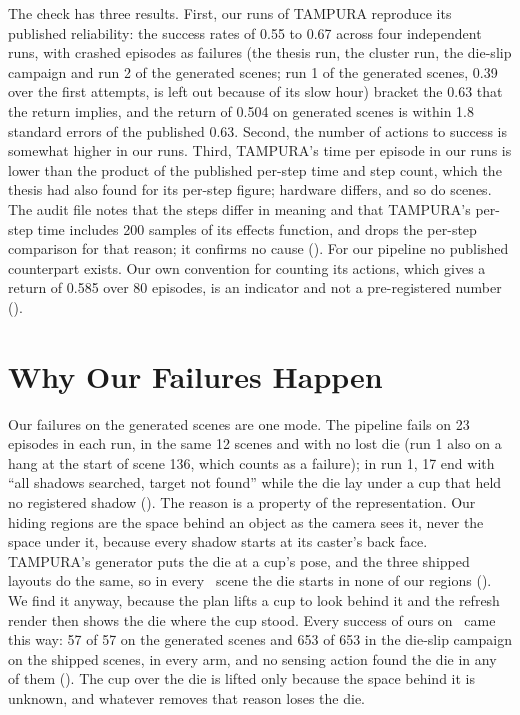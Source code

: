 The check has three results. First, our runs of TAMPURA reproduce its published
reliability: the success rates of 0.55 to 0.67 across four independent runs, with
crashed episodes as failures (the thesis run, the cluster run, the die-slip campaign
and run 2 of the generated scenes; run 1 of the generated scenes, 0.39 over the first
attempts, is left out because of its slow hour) bracket the 0.63 that the return
implies, and the return of 0.504 on generated scenes is within 1.8 standard errors of
the published 0.63. Second, the number of
actions to success is somewhat higher in our runs. Third, TAMPURA's time per
episode in our runs is lower than the product of the published per-step time and
step count, which the thesis had also found for its per-step figure; hardware
differs, and so do scenes. The audit file notes that the steps differ in meaning and
that TAMPURA's per-step time includes 200 samples of its effects function, and drops
the per-step comparison for that reason; it confirms no cause (). For our pipeline
no published counterpart exists. Our own convention for counting its actions,
which gives a return of 0.585 over 80 episodes, is an indicator and not a
pre-registered number ().

\section{Why Our Failures Happen}
\label{sec:why-fail}

Our failures on the generated scenes are one mode. The pipeline fails on 23
episodes in each run, in the same 12 scenes and with no lost die (run 1 also on a hang
at the start of scene 136, which counts as a failure); in run 1, 17 end with ``all shadows searched, target not found'' while the die lay under
a cup that held no registered shadow (). The reason is a property of the
representation. Our hiding regions are the space behind an object as the camera
sees it, never the space under it, because every shadow starts at its caster's back
face. TAMPURA's generator puts the die at a cup's pose, and the three shipped
layouts do the same, so in every \fdice\ scene the die starts in none of our regions
(). We find it anyway, because the plan lifts a cup to look behind it and
the refresh render then shows the die where the cup stood. Every success of ours
on \fdice\ came this way: 57 of 57 on the generated scenes and 653 of 653 in the
die-slip campaign on the shipped scenes, in every arm, and no sensing action found
the die in any of them (). The cup over the die is lifted only because the
space behind it is unknown, and whatever removes that reason loses the die.

